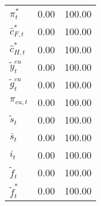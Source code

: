 \begin{center}
\begin{longtable}{lcc}
${\pi_t^*}            $	 & 	              0.00	 & 	            100.00 \\ 
${\hat c_{F,t}^*}     $	 & 	              0.00	 & 	            100.00 \\ 
${\hat c_{H,t}^*}     $	 & 	              0.00	 & 	            100.00 \\ 
${\tilde y_t^{cu}}    $	 & 	              0.00	 & 	            100.00 \\ 
${\tilde g_t^{cu}}    $	 & 	              0.00	 & 	            100.00 \\ 
${\pi_{cu,t}}         $	 & 	              0.00	 & 	            100.00 \\ 
${\tilde s_t}         $	 & 	              0.00	 & 	            100.00 \\ 
${\bar s_t}           $	 & 	              0.00	 & 	            100.00 \\ 
${i_t}                $	 & 	              0.00	 & 	            100.00 \\ 
${\tilde f_t}         $	 & 	              0.00	 & 	            100.00 \\ 
${\tilde f_t^*}       $	 & 	              0.00	 & 	            100.00 \\ 
\end{longtable}
 \end{center}
